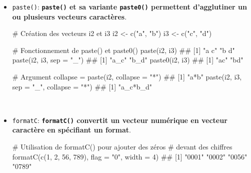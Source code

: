 \documentclass[12pt,twosided, notitlepage]{book}
\newenvironment{Shaded}{}{}
\newcommand{\CommentTok}[1]{\textcolor[rgb]{0.00,0.50,0.00}{#1}}
\newcommand{\DataTypeTok}[1]{#1}
\newcommand{\DecValTok}[1]{#1}
\newcommand{\KeywordTok}[1]{\textcolor[rgb]{0.00,0.00,1.00}{#1}}
\newcommand{\NormalTok}[1]{#1}
\newcommand{\StringTok}[1]{\textcolor[rgb]{0.00,0.50,0.50}{#1}}
\renewenvironment{Shaded}{\begin{snugshade}}{\end{snugshade}}
\begin{document}
\begin{itemize}
\item
  \texttt{paste()}:
  \textbf{\texttt{paste()} et sa variante \texttt{paste0()} permettent
  d'agglutiner un ou plusieurs vecteurs
  caractères}.

\begin{Shaded}
\begin{Highlighting}[]
\CommentTok{# Création des vecteurs i2 et i3}
\NormalTok{i2 <-}\StringTok{ }\KeywordTok{c}\NormalTok{(}\StringTok{"a"}\NormalTok{, }\StringTok{"b"}\NormalTok{)}
\NormalTok{i3 <-}\StringTok{ }\KeywordTok{c}\NormalTok{(}\StringTok{"c"}\NormalTok{, }\StringTok{"d"}\NormalTok{)}

\CommentTok{# Fonctionnement de paste() et paste0()}
\KeywordTok{paste}\NormalTok{(i2, i3)}
\NormalTok{  ## [1] "a c" "b d"}
\KeywordTok{paste}\NormalTok{(i2, i3, }\DataTypeTok{sep =} \StringTok{"_"}\NormalTok{)}
\NormalTok{  ## [1] "a_c" "b_d"}
\KeywordTok{paste0}\NormalTok{(i2, i3)}
\NormalTok{  ## [1] "ac" "bd"}

\CommentTok{# Argument collapse = }
\KeywordTok{paste}\NormalTok{(i2, }\DataTypeTok{collapse =} \StringTok{"*"}\NormalTok{)}
\NormalTok{  ## [1] "a*b"}
\KeywordTok{paste}\NormalTok{(i2, i3, }\DataTypeTok{sep =} \StringTok{"_"}\NormalTok{, }\DataTypeTok{collapse =} \StringTok{"*"}\NormalTok{)}
\NormalTok{  ## [1] "a_c*b_d"}
\end{Highlighting}
\end{Shaded}
\end{itemize}

~

\begin{itemize}
\item
  \texttt{formatC}:
  \textbf{\texttt{formatC()} convertit un vecteur numérique en vecteur
  caractère en spécifiant un format}.

\begin{Shaded}
\begin{Highlighting}[]
\CommentTok{# Utilisation de formatC() pour ajouter des zéros}
\CommentTok{# devant des chiffres }
\KeywordTok{formatC}\NormalTok{(}\KeywordTok{c}\NormalTok{(}\DecValTok{1}\NormalTok{, }\DecValTok{2}\NormalTok{, }\DecValTok{56}\NormalTok{, }\DecValTok{789}\NormalTok{), }\DataTypeTok{flag =} \StringTok{"0"}\NormalTok{, }\DataTypeTok{width =} \DecValTok{4}\NormalTok{)}
\NormalTok{  ## [1] "0001" "0002" "0056" "0789"}
\end{Highlighting}
\end{Shaded}
\end{itemize}
\end{document}
